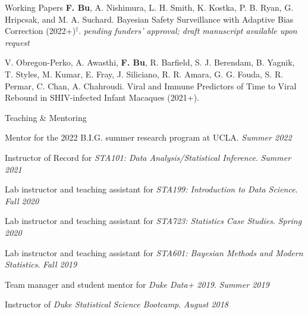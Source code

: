 \documentclass{resume} %
\begin{document}
\begin{rSection}{Working Papers}
\textbf{F. Bu}, A. Nishimura, L. H. Smith, K. Kostka, P. B. Ryan, G. Hripcsak, and M. A. Suchard.
Bayesian Safety Surveillance with Adaptive Bias Correction (2022+)$^\dagger$. \emph{pending funders' approval; draft manuscript available upon request}

\smallskip








V. Obregon-Perko, A. Awasthi, \textbf{F. Bu}, R. Barfield, S. J. Berendam, B. Yagnik,  T. Styles, M. Kumar, E. Fray, J. Siliciano, R. R. Amara, G. G. Fouda, S. R. Permar, C. Chan, A. Chahroudi. 
Viral and Immune Predictors of Time to Viral Rebound in SHIV-infected Infant Macaques (2021+).
\end{rSection}


\begin{rSection}{Teaching \& Mentoring}

Mentor for the 2022 B.I.G. summer research program at UCLA.  \hfill {\em Summer 2022}

Instructor of Record for \emph{STA101: Data Analysis/Statistical Inference}. \hfill {\em Summer 2021}

Lab instructor and teaching assistant for \emph{STA199: Introduction to Data Science}. \hfill {\em Fall 2020}


Lab instructor and teaching assistant for \emph{STA723: Statistics Case Studies}. \hfill {\em Spring 2020}


Lab instructor and teaching assistant for \emph{STA601: Bayesian Methods and Modern Statistics}. \hfill {\em Fall 2019}


Team manager and student mentor for \emph{Duke Data+ 2019}. \hfill {\em Summer 2019}

Instructor of \emph{Duke Statistical Science Bootcamp}. \hfill {\em August 2018}
\end{rSection}
\end{document}
